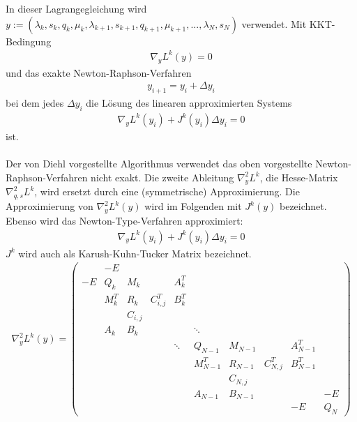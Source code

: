 In dieser Lagrangegleichung wird $ y := (\lambda_{k},s_{k},q_{k},\mu_{k},\lambda_{k+1},s_{k+1},q_{k+1},\mu_{k+1}, ...,\lambda_{N},s_{N}) $ verwendet.
  Mit KKT-Bedingung
  \begin{align}
  \nabla_{y} L^{k}(y)  = 0
  \end{align}
  und das exakte Newton-Raphson-Verfahren
  \begin{align}
  y_{i+1} = y_i + \Delta y_i
  \end{align}
  bei dem jedes $ \Delta y_i $ die Lösung des linearen approximierten Systems
  \begin{align} 
  \nabla_{y} L^{k}(y_{i}) + J^{k}(y_{i}) \Delta y_{i} = 0
  \end{align}
  ist.\\\\
  Der von Diehl \cite{Diehl2001} vorgestellte Algorithmus verwendet das oben vorgestellte Newton-Raphson-Verfahren nicht exakt. Die zweite Ableitung $ \nabla^{2}_{y} L^{k} $, die Hesse-Matrix $ \nabla^{2}_{q,s} L^{k} $, wird ersetzt durch eine (symmetrische) Approximierung. Die Approximierung von $ \nabla^{2}_{y} L^{k}(y) $ wird im Folgenden mit $ J^{k}(y) $ bezeichnet. Ebenso wird das Newton-Type-Verfahren approximiert:
  \begin{align} 
  \nabla_{y} L^{k}(y_{i}) + J^{k}(y_{i}) \Delta y_{i} = 0
  \end{align}
  $ J^{k} $ wird auch als Karush-Kuhn-Tucker Matrix bezeichnet.\\
  \begin{align}\label{matrix:kkt}
   \nabla^{2}_{y} L^{k}(y) = 
  \begin{pmatrix}
    & -E &   &   &  &  &   &   &  &    \\
  -E& Q_k & M_k  &  & A_k^{T} &  &  &   &    &       \\
    & M_k^T & R_k & C_{i, j}^T &   B_k^{T} &  & &  &   &      \\
    &       & C_{i, j} &         &  &   & &  &    \\
    & A_k & B_k &  &   & \ddots &   & &  &    \\
    &  &  &   & \ddots & Q_{N-1} & M_{N-1} &  & A_{N-1}^{T}  &     \\
    &  &  &  &      & M_{N-1}^T  & R_{N-1} & C_{N, j}^T & B_{N-1}^{T}  &     \\
    &  &  &  &      &            & C_{N, j}  & &              &    \\
    &  &  &  &      & A_{N-1} & B_{N-1}  & &    & -E \\
    &  &  &  & &  & &  & -E & Q_{N}
  \end{pmatrix} 
\end{align}
